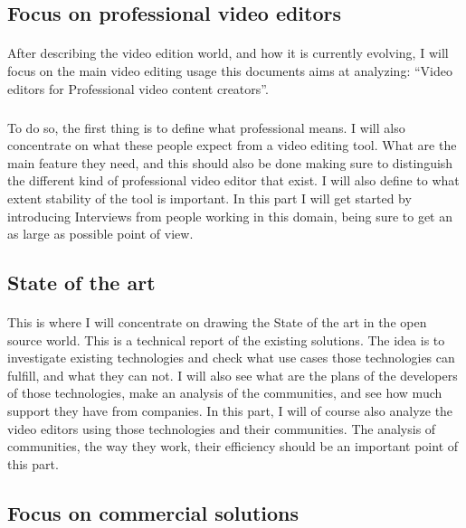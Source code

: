     \subsection{Focus on professional video editors}
        \paragraph{}
            After describing the video edition world, and how it is currently
            evolving, I will focus on the main video editing usage this documents
            aims at analyzing: ``Video editors for Professional video content
            creators''.

       \subparagraph{}
            To do so, the first thing is to define what professional means. I will
            also concentrate on what these people expect from a video editing tool.
            What are the main feature they need, and this should also be done
            making sure to distinguish the different kind of professional video
            editor that exist. I will also define to what extent stability of the
            tool is important. In this part I will get started by introducing
            Interviews from people working in this domain, being sure to get an
            as large as possible point of view.

    \subsection{State of the art}
       \paragraph{}
            This is where I will concentrate on drawing the State of the art in
            the open source world. This is a  technical report of the existing
            solutions.  The idea is to investigate existing technologies and
            check what use cases those technologies can fulfill, and what they
            can not. I will also see what are the plans of the developers of
            those technologies, make an analysis of the communities, and see
            how much support they have from companies. In this part, I will of
            course also analyze the video editors using those technologies and
            their communities. The analysis of communities, the way they work,
            their efficiency should be an important point of this part.

    \subsection{Focus on commercial solutions}
